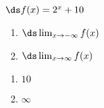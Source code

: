 {$\ds f(x) = 2^x+10$
\begin{enumerate}
\item		$\ds \lim_{x\to -\infty} f(x)$
\item		$\ds \lim_{x\to \infty} f(x)$
\end{enumerate}

}
{\begin{enumerate}
\item	$10$
\item	$\infty$
\end{enumerate}
}
